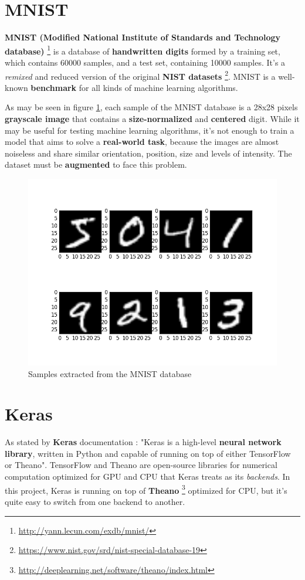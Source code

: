 \section{MNIST}\label{sec:MNIST}
\textbf{MNIST (Modified National Institute of Standards and Technology database)} \footnote{\url{http://yann.lecun.com/exdb/mnist/}} is a database of \textbf{handwritten digits} formed by a training set, which contains 60000 samples, and a test set, containing 10000 samples. It's a \textit{remixed} and reduced version of the original \textbf{NIST datasets} \footnote{\url{https://www.nist.gov/srd/nist-special-database-19}}. MNIST is a well-known \textbf{benchmark} for all kinds of machine learning algorithms.

As may be seen in figure \ref{fig:mnist}, each sample of the MNIST database is a 28x28 pixels \textbf{grayscale image} that contains a \textbf{size-normalized} and \textbf{centered} digit. While it may be useful for testing machine learning algorithms, it's not enough to train a model that aims to solve a \textbf{real-world task}, because the images are almost noiseless and share similar orientation, position, size and levels of intensity. The dataset must be \textbf{augmented} to face this problem.
\begin{figure}
	\centering
	\includegraphics[width=12cm, keepaspectratio]{figures/mnist.png}
	\caption{Samples extracted from the MNIST database}
	\label{fig:mnist}
\end{figure}

\section{Keras}\label{sec:keras}
As stated by \textbf{Keras} documentation \cite{chollet2015keras}: "Keras is a high-level \textbf{neural network library}, written in Python and capable of running on top of either TensorFlow or Theano". TensorFlow and Theano are open-source libraries for numerical computation optimized for GPU and CPU that Keras treats as its \textit{backends}. In this project, Keras is running on top of \textbf{Theano} \footnote{\url{http://deeplearning.net/software/theano/index.html}} optimized for CPU, but it's quite easy to switch from one backend to another.

